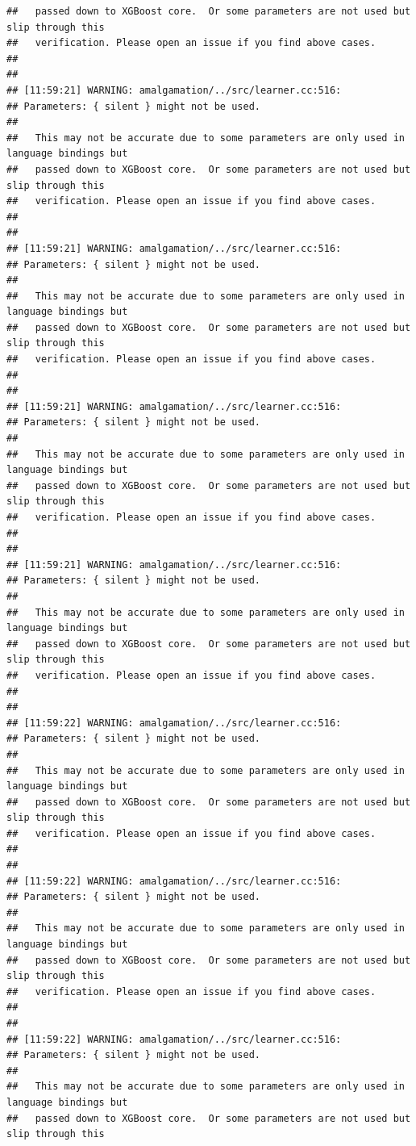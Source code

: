 \documentclass[AMS,STIX2COL]{WileyNJD-v2}\usepackage[]{graphicx}\usepackage[]{color}
\makeatletter
\newenvironment{kframe}{%
 \def\at@end@of@kframe{}%
 \ifinner\ifhmode%
  \def\at@end@of@kframe{\end{minipage}}%
  \begin{minipage}{\columnwidth}%
 \fi\fi%
 \def\FrameCommand##1{\hskip\@totalleftmargin \hskip-\fboxsep
 \colorbox{shadecolor}{##1}\hskip-\fboxsep
     \hskip-\linewidth \hskip-\@totalleftmargin \hskip\columnwidth}%
 \MakeFramed {\advance\hsize-\width
   \@totalleftmargin\z@ \linewidth\hsize
   \@setminipage}}%
 {\par\unskip\endMakeFramed%
 \at@end@of@kframe}
\newenvironment{knitrout}{}{} %
\makeatother
\begin{document}
\begin{knitrout}
\begin{kframe}
\begin{verbatim}
##   passed down to XGBoost core.  Or some parameters are not used but slip through this
##   verification. Please open an issue if you find above cases.
## 
## 
## [11:59:21] WARNING: amalgamation/../src/learner.cc:516: 
## Parameters: { silent } might not be used.
## 
##   This may not be accurate due to some parameters are only used in language bindings but
##   passed down to XGBoost core.  Or some parameters are not used but slip through this
##   verification. Please open an issue if you find above cases.
## 
## 
## [11:59:21] WARNING: amalgamation/../src/learner.cc:516: 
## Parameters: { silent } might not be used.
## 
##   This may not be accurate due to some parameters are only used in language bindings but
##   passed down to XGBoost core.  Or some parameters are not used but slip through this
##   verification. Please open an issue if you find above cases.
## 
## 
## [11:59:21] WARNING: amalgamation/../src/learner.cc:516: 
## Parameters: { silent } might not be used.
## 
##   This may not be accurate due to some parameters are only used in language bindings but
##   passed down to XGBoost core.  Or some parameters are not used but slip through this
##   verification. Please open an issue if you find above cases.
## 
## 
## [11:59:21] WARNING: amalgamation/../src/learner.cc:516: 
## Parameters: { silent } might not be used.
## 
##   This may not be accurate due to some parameters are only used in language bindings but
##   passed down to XGBoost core.  Or some parameters are not used but slip through this
##   verification. Please open an issue if you find above cases.
## 
## 
## [11:59:22] WARNING: amalgamation/../src/learner.cc:516: 
## Parameters: { silent } might not be used.
## 
##   This may not be accurate due to some parameters are only used in language bindings but
##   passed down to XGBoost core.  Or some parameters are not used but slip through this
##   verification. Please open an issue if you find above cases.
## 
## 
## [11:59:22] WARNING: amalgamation/../src/learner.cc:516: 
## Parameters: { silent } might not be used.
## 
##   This may not be accurate due to some parameters are only used in language bindings but
##   passed down to XGBoost core.  Or some parameters are not used but slip through this
##   verification. Please open an issue if you find above cases.
## 
## 
## [11:59:22] WARNING: amalgamation/../src/learner.cc:516: 
## Parameters: { silent } might not be used.
## 
##   This may not be accurate due to some parameters are only used in language bindings but
##   passed down to XGBoost core.  Or some parameters are not used but slip through this

\end{verbatim}
\end{kframe}
\end{knitrout}
\end{document}
